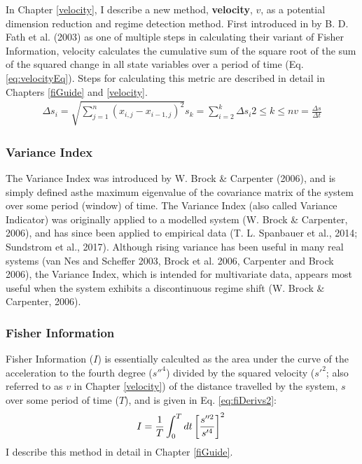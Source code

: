 \documentclass[12pt,twoside,openany]{reedthesis}
\begin{document}
In Chapter \ref{velocity}, I describe a new method, \textbf{velocity},
\(v\), as a potential dimension reduction and regime detection method.
First introduced in by B. D. Fath et al. (2003) as one of multiple steps
in calculating their variant of Fisher Information, velocity calculates
the cumulative sum of the square root of the sum of the squared change
in all state variables over a period of time (Eq. \eqref{eq:velocityEq}).
Steps for calculating this metric are described in detail in Chapters
\ref{fiGuide} and \ref{velocity}.
\begin{equation}
\begin{array}{rcr}
\Delta s_i = \sqrt{\sum_{j=1}^{n} (x_{i,j} -x_{i-1, j})^2}
s_k =  \sum_{i=2}^{k}\Delta{s_i}
2\leq k \leq n
v =\frac{\Delta s}{\Delta t}  
\end{array}
\label{eq:velocityEq}
\end{equation}
\subsubsection{Variance Index}\label{variance-index}

The Variance Index was introduced by W. Brock \& Carpenter (2006), and
is simply defined asthe maximum eigenvalue of the covariance matrix of
the system over some period (window) of time. The Variance Index (also
called Variance Indicator) was originally applied to a modelled system
(W. Brock \& Carpenter, 2006), and has since been applied to empirical
data (T. L. Spanbauer et al., 2014; Sundstrom et al., 2017). Although
rising variance has been useful in many real systems (van Nes and
Scheffer 2003, Brock et al. 2006, Carpenter and Brock 2006), the
Variance Index, which is intended for multivariate data, appears most
useful when the system exhibits a discontinuous regime shift (W. Brock
\& Carpenter, 2006).

\subsubsection{Fisher Information}\label{fisher-information}

Fisher Information (\(I\)) is essentially calculted as the area under
the curve of the acceleration to the fourth degree (\(s''^4\)) divided
by the squared velocity (\(s'^2\); also referred to as \(v\) in Chapter
\ref{velocity}) of the distance travelled by the system, \(s\) over some
period of time (\(T\)), and is given in Eq. \eqref{eq:fiDerivs2}:
\begin{equation}   
    I = \frac{1}{T} \int_0^T dt\left[\frac{s''^2}{s'^4}\right]^2 \\  
  \label{eq:fiDerivs2}  
\end{equation}
I describe this method in detail in Chapter \ref{fiGuide}.
\end{document}
